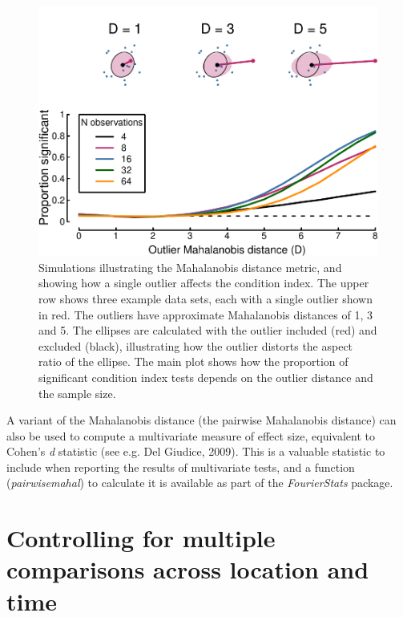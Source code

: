 \documentclass[]{article}
\begin{document}
\begin{figure}

{\centering \includegraphics{manuscript_files/figure-latex/outlierplot-1} 

}

\caption{Simulations illustrating the Mahalanobis distance metric, and showing how a single outlier affects the condition index. The upper row shows three example data sets, each with a single outlier shown in red. The outliers have approximate Mahalanobis distances of 1, 3 and 5. The ellipses are calculated with the outlier included (red) and excluded (black), illustrating how the outlier distorts the aspect ratio of the ellipse. The main plot shows how the proportion of significant condition index tests depends on the outlier distance and the sample size.}\label{fig:outlierplot}
\end{figure}

A variant of the Mahalanobis distance (the pairwise Mahalanobis distance) can also be used to compute a multivariate measure of effect size, equivalent to Cohen's \emph{d} statistic (see e.g. Del Giudice, 2009). This is a valuable statistic to include when reporting the results of multivariate tests, and a function (\emph{pairwisemahal}) to calculate it is available as part of the \emph{FourierStats} package.

\hypertarget{controlling-for-multiple-comparisons-across-location-and-time}{%
\section{Controlling for multiple comparisons across location and time}\label{controlling-for-multiple-comparisons-across-location-and-time}}
\end{document}
